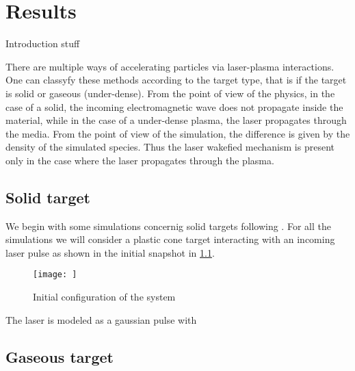 \documentclass[12pt, class=report, crop=false]{standalone}
\begin{document}
\chapter{Results}%
\label{chap:results}

Introduction stuff

There are multiple ways of accelerating particles via laser-plasma interactions.
One can classyfy these methods according to the target type, that is if the
target is solid or gaseous (under-dense). From the point of view of the physics, in the
case of a solid, the incoming electromagnetic wave does not propagate inside
the material, while in the case of a under-dense plasma, the laser propagates
through the media. From the point of view of the simulation, the difference is
given by the density of the simulated species. Thus the laser wakefied mechanism
is present only in the case where the laser propagates through the plasma.

\section{Solid target}

We begin with some simulations concernig solid targets following
\textcite{budriga_modelingultrahigh_2017}. For all the simulations we will consider
a plastic cone target interacting with an incoming laser pulse as shown in the
initial snapshot in \cref{fig:initial-plasma-laser}.

\begin{figure}[h]
    \centering
    \texttt{[image: ]}
    \caption{Initial configuration of the system}
    \label{fig:initial-plasma-laser}
\end{figure}

The laser is modeled as a gaussian pulse with

\section{Gaseous target}
\end{document}
